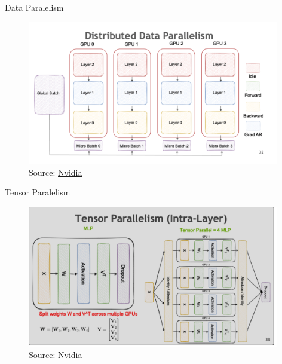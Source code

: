 
\begin{vbframe}{Data Paralelism}

\vfill

\begin{figure}
	\centering
	\includegraphics[width = 11cm]{./figure/data_parallel.png} \\ 
	{\footnotesize Source: \href{https://docs.nvidia.com/deeplearning/nemo/user-guide/docs/en/stable/nlp/nemo_megatron/parallelisms.html}{Nvidia}}
\end{figure}

\vfill

\end{vbframe}


\begin{vbframe}{Tensor Paralelism}

\vfill

\begin{figure}
	\centering
	\includegraphics[width = 11cm]{./figure/tensor_paralel.png} \\ 
	{\footnotesize Source: \href{https://docs.nvidia.com/deeplearning/nemo/user-guide/docs/en/stable/nlp/nemo_megatron/parallelisms.html}{Nvidia}}
\end{figure}

\vfill

\end{vbframe}

